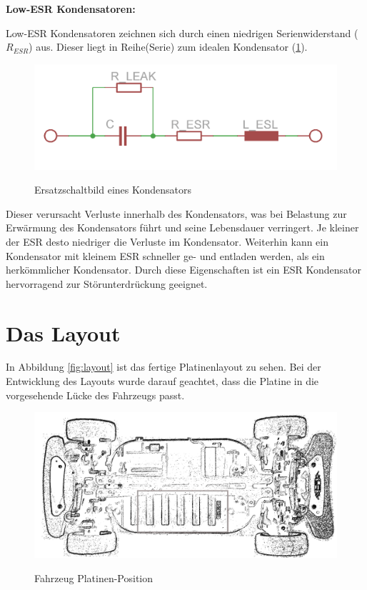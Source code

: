 \begin{minipage}{0.9\textwidth}
\textbf{Low-ESR Kondensatoren:\\}

Low-ESR Kondensatoren zeichnen sich durch einen niedrigen Serienwiderstand ($R_{ESR}$) aus.
Dieser liegt in Reihe(Serie) zum idealen Kondensator (\cref{fig:esr}). 

\begin{figure}[H]
\centering
\includegraphics[width=.56\textwidth]{esr.png}\\
\caption{Ersatzschaltbild eines Kondensators}%
\label{fig:esr}
\end{figure}

Dieser verursacht Verluste innerhalb des Kondensators, was bei Belastung zur Erwärmung des Kondensators führt und
seine Lebensdauer verringert. Je kleiner der ESR desto niedriger die Verluste im Kondensator. Weiterhin
kann ein Kondensator mit kleinem ESR schneller ge- und entladen werden, als ein herkömmlicher Kondensator.
Durch diese Eigenschaften ist ein ESR Kondensator hervorragend zur Störunterdrückung geeignet.
\end{minipage}





\section{Das Layout}
In Abbildung \ref{fig:layout} ist das fertige Platinenlayout zu sehen. Bei der Entwicklung des Layouts wurde darauf geachtet, dass die Platine in die vorgesehende Lücke des Fahrzeugs passt.

\begin{figure}[H]
\centering
\includegraphics[width=.8\textwidth]{auto_struck.png}\\
\caption{Fahrzeug Platinen-Position}%
\label{fig:car_struc}
\end{figure}

